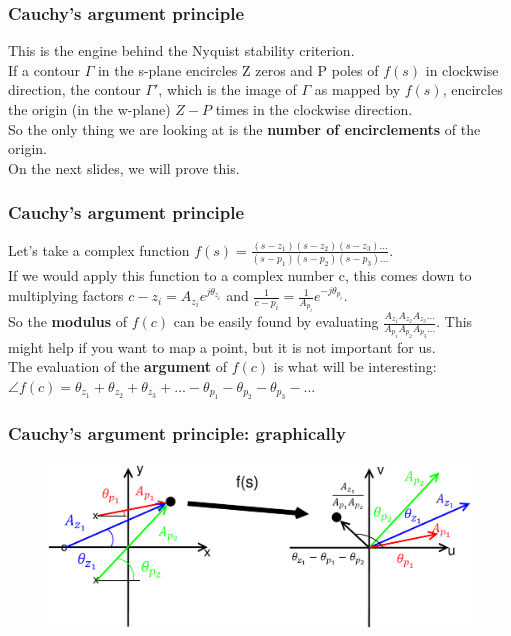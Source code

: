 \begin{frame}
	\frametitle{Cauchy's argument principle}
	\vspace{-7ex}
	This is the engine behind the Nyquist stability criterion.\\
	\medskip
	If a contour $\Gamma$ in the s-plane encircles Z zeros and P poles of $f(s)$ in clockwise direction, the contour $\Gamma'$, which is the image of $\Gamma$ as mapped by $f(s)$, encircles the origin (in the w-plane) $Z-P$ times in the clockwise direction.\\
	\medskip
	So the only thing we are looking at is the \textbf{number of encirclements} of the origin. \\
	On the next slides, we will prove this.
\end{frame}

\begin{frame}
	\frametitle{Cauchy's argument principle}
	\vspace{-3ex}
	Let's take a complex function $f(s)=\frac{(s-z_1)(s-z_2)(s-z_3)...}{(s-p_1)(s-p_2)(s-p_3)...}$.\\
	\medskip
	If we would apply this function to a complex number c, this comes down to multiplying factors $c-z_i = A_{z_{i}}e^{j\theta_{z_{i}}}$ and $\frac{1}{c-p_i}=\frac{1}{A_{p_{i}}}e^{-j\theta_{p_{i}}}$.\\
	\medskip
	So the \textbf{modulus} of $f(c)$ can be easily found by evaluating $\frac{A_{z_{1}}A_{z_{2}}A_{z_{3}}...}{A_{p_{1}}A_{p_{2}}A_{p_{3}}...}$.	This might help if you want to map a point, but it is not important for us.\\
	\medskip
	The evaluation of the \textbf{argument} of $f(c)$ is what will be interesting: $\angle f(c) = \theta_{z_{1}}+\theta_{z_{2}}+\theta_{z_{3}}+...-\theta_{p_{1}}-\theta_{p_{2}}-\theta_{p_{3}}-...$
\end{frame}

\begin{frame}
	\frametitle{Cauchy's argument principle: graphically}
	\begin{figure}
		\includegraphics[width=1.0\linewidth]{graphical}
	\end{figure}
\end{frame}

